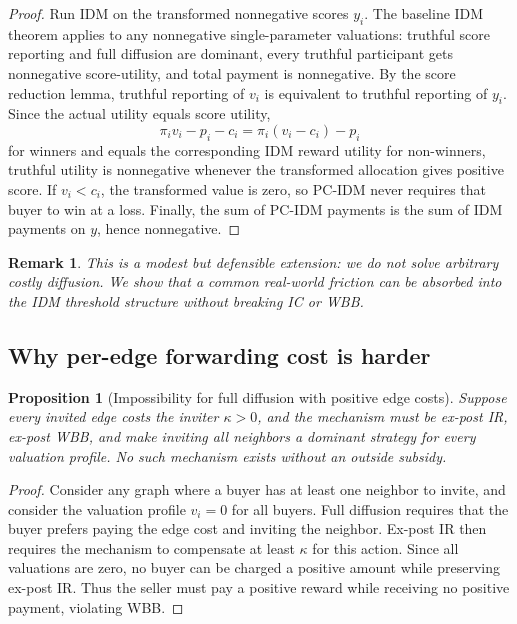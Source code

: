\documentclass[11pt]{article}
\newtheorem{proposition}{Proposition}
\newtheorem{remark}{Remark}
\begin{document}
\begin{proof}
Run IDM on the transformed nonnegative scores $y_i$.  The baseline IDM theorem applies to any nonnegative single-parameter valuations: truthful score reporting and full diffusion are dominant, every truthful participant gets nonnegative score-utility, and total payment is nonnegative.  By the score reduction lemma, truthful reporting of $v_i$ is equivalent to truthful reporting of $y_i$.  Since the actual utility equals score utility,
\[
    \pi_i v_i-p_i-c_i = \pi_i(v_i-c_i)-p_i
\]
for winners and equals the corresponding IDM reward utility for non-winners, truthful utility is nonnegative whenever the transformed allocation gives positive score.  If $v_i<c_i$, the transformed value is zero, so PC-IDM never requires that buyer to win at a loss.  Finally, the sum of PC-IDM payments is the sum of IDM payments on $y$, hence nonnegative.
\end{proof}

\begin{remark}
This is a modest but defensible extension: we do not solve arbitrary costly diffusion.  We show that a common real-world friction can be absorbed into the IDM threshold structure without breaking IC or WBB.
\end{remark}

\subsection{Why per-edge forwarding cost is harder}

\begin{proposition}[Impossibility for full diffusion with positive edge costs]
Suppose every invited edge costs the inviter $\kappa>0$, and the mechanism must be ex-post IR, ex-post WBB, and make inviting all neighbors a dominant strategy for every valuation profile.  No such mechanism exists without an outside subsidy.
\end{proposition}

\begin{proof}
Consider any graph where a buyer has at least one neighbor to invite, and consider the valuation profile $v_i=0$ for all buyers.  Full diffusion requires that the buyer prefers paying the edge cost and inviting the neighbor.  Ex-post IR then requires the mechanism to compensate at least $\kappa$ for this action.  Since all valuations are zero, no buyer can be charged a positive amount while preserving ex-post IR.  Thus the seller must pay a positive reward while receiving no positive payment, violating WBB.
\end{proof}
\end{document}
